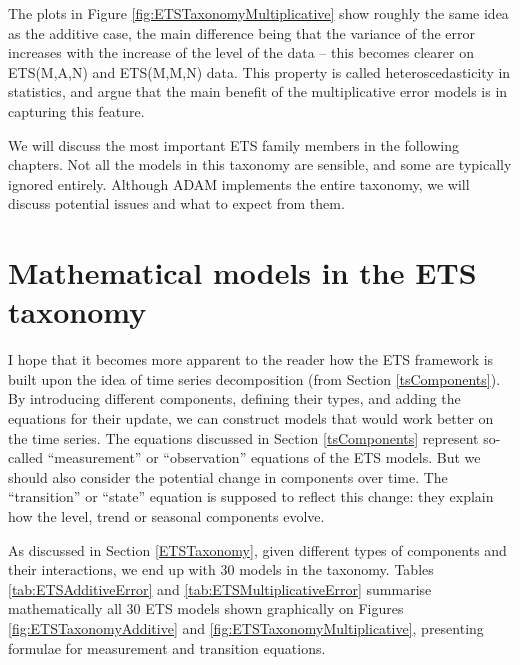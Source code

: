 \documentclass[
]{book}
\theoremstyle{definition}
\theoremstyle{definition}
\theoremstyle{definition}
\theoremstyle{definition}
\theoremstyle{remark}
\begin{document}
The plots in Figure \ref{fig:ETSTaxonomyMultiplicative} show roughly the same idea as the additive case, the main difference being that the variance of the error increases with the increase of the level of the data -- this becomes clearer on ETS(M,A,N) and ETS(M,M,N) data. This property is called heteroscedasticity in statistics, and \citet{Hyndman2008b} argue that the main benefit of the multiplicative error models is in capturing this feature.

We will discuss the most important ETS family members in the following chapters. Not all the models in this taxonomy are sensible, and some are typically ignored entirely. Although ADAM implements the entire taxonomy, we will discuss potential issues and what to expect from them.

\hypertarget{ETSTaxonomyMaths}{%
\section{Mathematical models in the ETS taxonomy}\label{ETSTaxonomyMaths}}

I hope that it becomes more apparent to the reader how the ETS framework is built upon the idea of time series decomposition (from Section \ref{tsComponents}). By introducing different components, defining their types, and adding the equations for their update, we can construct models that would work better on the time series. The equations discussed in Section \ref{tsComponents} represent so-called ``measurement'' or ``observation'' equations of the ETS models. But we should also consider the potential change in components over time. The ``transition'' or ``state'' equation is supposed to reflect this change: they explain how the level, trend or seasonal components evolve.

As discussed in Section \ref{ETSTaxonomy}, given different types of components and their interactions, we end up with 30 models in the taxonomy. Tables \ref{tab:ETSAdditiveError} and \ref{tab:ETSMultiplicativeError} summarise mathematically all 30 ETS models shown graphically on Figures \ref{fig:ETSTaxonomyAdditive} and \ref{fig:ETSTaxonomyMultiplicative}, presenting formulae for measurement and transition equations.
\end{document}
